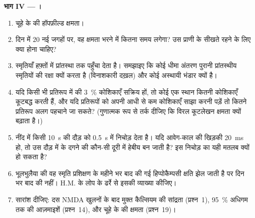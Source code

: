 \begin{problem}
\medskip
\noindent\textbf{भाग IV --- ।}
\begin{enumerate}[resume]
  \item चूहे के  की हॉपफ़ील्ड क्षमता।
  \item दिन में $20$ नई जगहों पर, वह क्षमता भरने में कितना समय लगेगा?
        उस प्राणी के सीखते रहने के लिए क्या होना चाहिए?
  \item {} स्मृतियाँ हफ़्तों में प्रांतस्था तक पहुँचा देता है।
        समझाइए कि कोई धीमा अंतरण पुरानी प्रांतस्थीय स्मृतियों की रक्षा
        क्यों करता है (विनाशकारी दख़ल) और  कोई अस्थायी
        भंडार क्यों है।
  \item यदि किसी भी प्रतिरूप में  की \qty{3}{\%} कोशिकाएँ सक्रिय
        हों, तो कोई एक स्थान कितनी कोशिकाएँ कूटबद्ध करती हैं, और यदि
        प्रतिरूपों को अपनी आधी से कम कोशिकाएँ साझा करनी पड़ें तो कितने
        प्रतिरूप अलग पहचाने जा सकते? (गुणात्मक रूप से तर्क दीजिए कि
        विरल कूटलेखन क्षमता क्यों बढ़ाता है।)
  \item नींद में  किसी \qty{10}{s} की दौड़ को \qty{0.5}{s} में
        निचोड़ देता है। यदि आवेग-काल की खिड़की \qty{20}{ms} हो, तो उस
        दौड़ में  के दगने की कौन-सी दूरी  में
        हेबीय बन जाती है? इस निचोड़ का यही मतलब क्यों हो सकता है?
  \item भूलभुलैया की वह स्मृति प्रशिक्षण के महीने भर बाद की गई
        हिप्पोकैम्पसी क्षति झेल जाती है पर दिन भर बाद की नहीं। H.M. के
        लोप के ढर्रे से इसकी व्याख्या कीजिए।
  \item सारांश दीजिए: दस NMDA खुलनों के बाद मुक्त कैल्सियम की सांद्रता
        (प्रश्न~1), \qty{95}{\%} अधिगम तक की आज़माइशें (प्रश्न~14), और
        चूहे के  की क्षमता (प्रश्न~19)।
\end{enumerate}
\end{problem}
